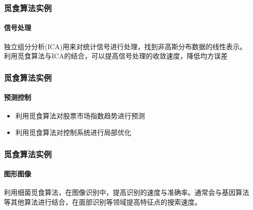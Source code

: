 \documentclass{beamer}
\begin{document}
\begin{frame}
\frametitle{觅食算法实例}
\framesubtitle{信号处理}
独立组分分析(ICA)用来对统计信号进行处理，找到非高斯分布数据的线性表示。利用觅食算法与ICA的结合，可以提高信号处理的收敛速度，降低均方误差
\end{frame}

\begin{frame}
\frametitle{觅食算法实例}
\framesubtitle{预测控制}
\begin{itemize}
\item 利用觅食算法对股票市场指数趋势进行预测
\item 利用觅食算法对控制系统进行局部优化
\end{itemize}
\end{frame}

\begin{frame}
\frametitle{觅食算法实例}
\framesubtitle{图形图像}
利用细菌觅食算法，在图像识别中，提高识别的速度与准确率。通常会与基因算法等其他算法进行结合，在面部识别等领域提高特征点的搜索速度。
\end{frame}
\end{document}
